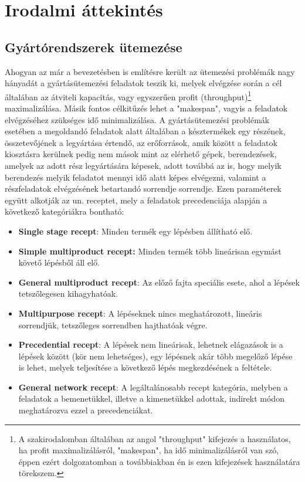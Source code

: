 \chapter{Irodalmi áttekintés} \label{Research}     
\section{Gyártórendszerek ütemezése}
Ahogyan az már a bevezetésben is említésre került az ütemezési problémák nagy hányadát a gyártásütemezési feladatok teszik ki, melyek elvégzése során a cél általában az átviteli kapacitás, vagy egyszerűen profit (throughput)\footnote{A szakirodalomban általában az angol "throughput" kifejezés a használatos, ha profit maximalizálásról, "makespan", ha idő minimalizálásról van szó, éppen ezért dolgozatomban a továbbiakban én is ezen kifejezések használatára törekszem.} maximalizálása.
Másik fontos célkitűzés lehet a "makespan", vagyis a feladatok elvégzéséhez szükséges idő minimalizálása.
A gyártásütemezési problémák esetében a megoldandó feladatok alatt általában a késztermékek egy részének, összetevőjének a legyártása értendő, az erőforrások, amik között a feladatok kiosztásra kerülnek pedig nem mások mint az elérhető gépek, berendezések, amelyek az adott rész legyártására képesek, adott továbbá az is, hogy melyik berendezés melyik feladatot mennyi idő alatt képes elvégezni, valamint a részfeladatok elvégzésének betartandó sorrendje sorrendje.
Ezen paraméterek együtt alkotják az un. receptet, mely a feladatok precedenciája alapján a következő kategóriákra bontható:
\begin{itemize}
\item[]\textbf{Single stage recept}: Minden termék egy lépésben állítható elő. 
\item[]\textbf{Simple multiproduct recept:} Minden termék több lineárisan egymást követő lépésből áll elő.
\item[]\textbf{General multiproduct recept}: Az előző fajta speciális esete, ahol a lépések tetszőlegesen kihagyhatóak.
\item[]\textbf{Multipurpose recept}: A lépéseknek nincs meghatározott, lineáris sorrendjük, tetszőleges sorrendben hajthatóak végre.
\item[]\textbf{Precedential recept}: A lépések nem lineárisak, lehetnek elágazások is a lépések között (kör nem lehetséges), egy lépésnek akár több megelőző lépése is lehet, melyek teljesítése a következő lépés megkezdésének a feltétele.
\item[]\textbf{General network recept}: A legáltalánosabb recept kategória, melyben a feladatok a bemenetükkel, illetve a kimenetükkel adottak, indirekt módon meghatározva ezzel a precedenciákat.\cite{hegyhati2010} 
\end{itemize}
